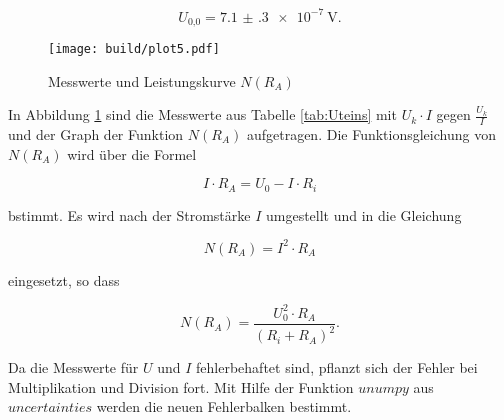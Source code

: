   \begin{equation}
    U_\text{0,0} = \SI{7.1(3)e-7}{\V}.
  \end{equation}

  \newpage

  \begin{figure}[h]
    \texttt{[image: build/plot5.pdf]}
    \caption{Messwerte und Leistungskurve $N(R_A)$}
    \label{fig:U5}
  \end{figure}

  In Abbildung \ref{fig:U5} sind die Messwerte aus Tabelle \ref{tab:Uteins}
  mit $U_k \cdot I$ gegen $\frac{U_k}{I}$ und der Graph der Funktion $N(R_A)$
  aufgetragen. Die Funktionsgleichung von $N(R_A)$ wird über die Formel

  \begin{equation}
    I \cdot R_A = U_0 - I \cdot R_i
  \end{equation}

  bstimmt. Es wird nach der Stromstärke $I$ umgestellt und in die Gleichung

  \begin{equation}
    N(R_A) = I^2 \cdot R_A
  \end{equation}

  eingesetzt, so dass

  \begin{equation}
    N(R_A) = \frac{U_0^2 \cdot R_A}{(R_i + R_A)^2}.
  \end{equation}

  Da die Messwerte für $U$ und $I$ fehlerbehaftet sind, pflanzt sich der
  Fehler bei Multiplikation und Division fort. Mit Hilfe der Funktion
  $unumpy$ aus $uncertainties$ werden die neuen Fehlerbalken bestimmt.
